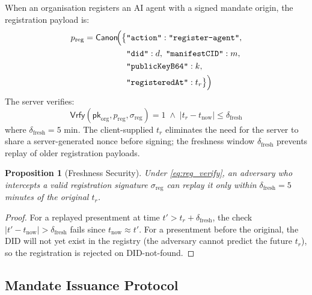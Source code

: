 \documentclass[conference]{IEEEtran}
\newtheorem{proposition}[theorem]{Proposition}
\newcommand{\pk}{\mathsf{pk}}
\newcommand{\sig}{\sigma}
\newcommand{\Vrfy}{\mathsf{Vrfy}}
\newcommand{\canon}{\mathsf{Canon}}
\begin{document}
When an organisation registers an AI agent with a signed
mandate origin, the registration payload is:
{\small\begin{align}
  p_{\text{reg}} = \canon\!\Bigl(
    \bigl\{
      &\texttt{"action"}: \texttt{"register-agent"},\nonumber\\
      &\texttt{"did"}: d,\;
       \texttt{"manifestCID"}: m,\nonumber\\
      &\texttt{"publicKeyB64"}: k,\nonumber\\
      &\texttt{"registeredAt"}: t_r
    \bigr\}
  \Bigr)
  \label{eq:reg_payload}
\end{align}}
The server verifies:
\begin{equation}
  \Vrfy(\pk_{\text{org}}, p_{\text{reg}},
    \sig_{\text{reg}}) = 1
  \;\wedge\;
  |t_r - t_{\text{now}}| \leq \delta_{\text{fresh}}
  \label{eq:reg_verify}
\end{equation}
where $\delta_{\text{fresh}} = 5\text{ min}$.  The
client-supplied $t_r$ eliminates the need for the server
to share a server-generated nonce before signing;
the freshness window $\delta_{\text{fresh}}$ prevents
replay of older registration payloads.

\begin{proposition}[Freshness Security]
\label{prop:fresh}
Under \eqref{eq:reg_verify}, an adversary who intercepts
a valid registration signature $\sig_{\text{reg}}$ can
replay it only within $\delta_{\text{fresh}} = 5$ minutes
of the original $t_r$.
\end{proposition}
\begin{proof}
For a replayed presentment at time $t' > t_r +
\delta_{\text{fresh}}$, the check $|t' - t_{\text{now}}| >
\delta_{\text{fresh}}$ fails since $t_{\text{now}} \approx t'$.
For a presentment before the original, the DID will not yet
exist in the registry (the adversary cannot predict the
future $t_r$), so the registration is rejected on DID-not-found.
\end{proof}

\subsection{Mandate Issuance Protocol}
\end{document}
